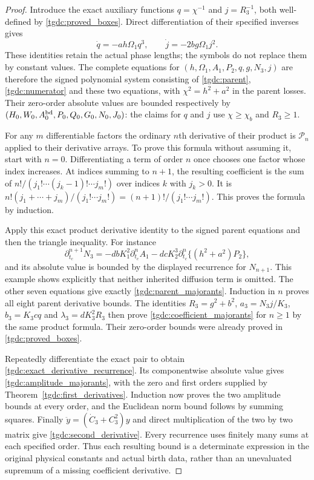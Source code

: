 \begin{proof}
Introduce the exact auxiliary functions $q=\chi^{-1}$ and
$j=R_3^{-1}$, both well-defined by \eqref{tgdc:proved_boxes}.
Direct differentiation of their specified inverses gives
\[
 \dot q=-ah\Omega_1q^3,\qquad
 \dot j=-2bg\Omega_1j^2.
\]
These identities retain the actual phase lengths; the symbols do not
replace them by constant values. The complete equations for
$(h,\Omega_1,A_1,P_2,q,g,N_3,j)$ are therefore the signed polynomial
system consisting of \eqref{tgdc:parent}, \eqref{tgdc:numerator} and
these two equations, with $\chi^2=h^2+a^2$ in the parent losses.
Their zero-order absolute values are bounded respectively by
$(H_0,W_0,A_0^{\rm bd},P_0,Q_0,G_0,N_0,J_0)$:
the claims for $q$ and $j$ use $\chi\geq\chi_b$ and $R_3\geq1$.

For any $m$ differentiable factors the ordinary $n$th derivative of
their product is $\mathcal P_n$ applied to their derivative arrays.
To prove this formula without assuming it, start with $n=0$.
Differentiating a term of order $n$ once chooses one factor whose
index increases. At indices summing to $n+1$, the resulting coefficient
is the sum of $n!/(j_1!\cdots(j_k-1)!\cdots j_m!)$ over indices
$k$ with $j_k>0$. It is
$n!(j_1+\cdots+j_m)/(j_1!\cdots j_m!)=(n+1)!/(j_1!\cdots j_m!)$.
This proves the formula by induction.

Apply this exact product derivative identity to the signed parent
equations and then the triangle inequality. For instance
\[
 \partial_{t_c}^{n+1}N_3
  =-dbK_1^2\partial_{t_c}^n A_1
   -dcK_2^3\partial_{t_c}^n\{(h^2+a^2)P_2\},
\]
and its absolute value is bounded by the displayed recurrence for
$N_{n+1}$. This example shows explicitly that neither inherited
diffusion term is omitted. The other seven equations give exactly
\eqref{tgdc:parent_majorants}. Induction in $n$ proves all eight parent
derivative bounds. The identities $R_3=g^2+b^2$,
$a_3=N_3j/K_3$, $b_3=K_3cq$ and $\lambda_3=dK_3^2R_3$ then prove
\eqref{tgdc:coefficient_majorants} for $n\geq1$ by the same product
formula. Their zero-order bounds were already proved in
\eqref{tgdc:proved_boxes}.

Repeatedly differentiate the exact pair to obtain
\eqref{tgdc:exact_derivative_recurrence}. Its componentwise absolute
value gives \eqref{tgdc:amplitude_majorants}, with the zero and first
orders supplied by Theorem~\ref{tgdc:first_derivatives}. Induction
now proves the two amplitude bounds at every order, and the Euclidean
norm bound follows by summing squares. Finally
$\ddot y=(\dot C_3+C_3^2)y$ and direct multiplication of the two by two
matrix give \eqref{tgdc:second_derivative}. Every recurrence uses
finitely many sums at each specified order. Thus each resulting bound
is a determinate expression in the original physical constants and
actual birth data, rather than an unevaluated supremum of a missing
coefficient derivative.
\end{proof}

